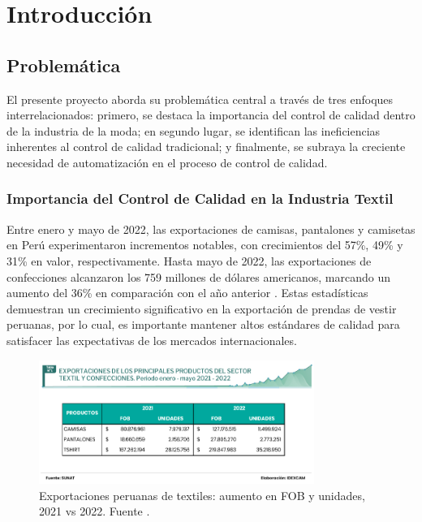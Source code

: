 
\chapter{Introducción}
\section{Problemática}

El presente proyecto aborda su problemática central a través de tres enfoques interrelacionados: primero, se destaca la importancia del control de calidad dentro de la industria de la moda; en segundo lugar, se identifican las ineficiencias inherentes al control de calidad tradicional; y finalmente, se subraya la creciente necesidad de automatización en el proceso de control de calidad.

\subsection*{Importancia del Control de Calidad en la Industria Textil}

Entre enero y mayo de 2022, las exportaciones de camisas, pantalones y camisetas en Perú experimentaron incrementos notables, con crecimientos del 57\%, 49\% y 31\% en valor, respectivamente. Hasta mayo de 2022, las exportaciones de confecciones alcanzaron los 759 millones de dólares americanos, marcando un aumento del 36\% en comparación con el año anterior \cite{LaCamara2022}. Estas estadísticas demuestran un crecimiento significativo en la exportación de prendas de vestir peruanas, por lo cual, es importante mantener altos estándares de calidad para satisfacer las expectativas de los mercados internacionales.

\begin{figure}[H]
	\centering
	\includegraphics[width=0.8\textwidth]{img/exportaciones.jpg}
	\caption[Exportaciones peruanas de textiles: aumento en FOB y unidades, 2021 vs 2022.]{Exportaciones peruanas de textiles: aumento en FOB y unidades, 2021 vs 2022. Fuente \cite{LaCamara2022}.}
\end{figure}

